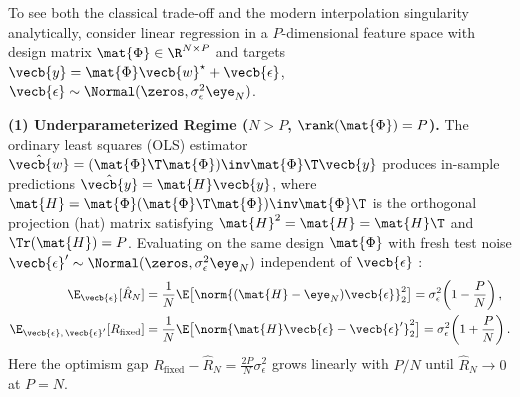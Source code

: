 \documentclass[../../../../master.tex]{subfiles}
\begin{document}
To see both the classical trade-off and the modern interpolation singularity analytically, consider linear regression in a $P$-dimensional feature space with design matrix $\mat{\Phi} \in \R^{N \times P}$ and targets $\vecb{y} = \mat{\Phi}\vecb{w}^\star + \vecb{\epsilon}$, $\vecb{\epsilon} \sim \Normal(\zeros, \sigma_\epsilon^2 \eye_N)$.

\begin{coremath}[Theorem: Exact Linear Risk Across the $P = N$ Threshold]
\label{thm:biasvar:linear_risk}
\textbf{(1) Underparameterized Regime ($N > P$, $\rank(\mat{\Phi}) = P$).}
The ordinary least squares (OLS) estimator $\hat{\vecb{w}} = (\mat{\Phi}\T\mat{\Phi})\inv\mat{\Phi}\T\vecb{y}$ produces in-sample predictions $\hat{\vecb{y}} = \mat{H}\vecb{y}$, where $\mat{H} = \mat{\Phi}(\mat{\Phi}\T\mat{\Phi})\inv\mat{\Phi}\T$ is the orthogonal projection (hat) matrix satisfying $\mat{H}^2 = \mat{H} = \mat{H}\T$ and $\Tr(\mat{H}) = P$. Evaluating on the same design $\mat{\Phi}$ with fresh test noise $\vecb{\epsilon}' \sim \Normal(\zeros, \sigma_\epsilon^2 \eye_N)$ independent of $\vecb{\epsilon}$ :
\begin{align}
  \E_{\vecb{\epsilon}}[\hat{R}_N] &= \frac{1}{N}\E\big[\norm{(\mat{H} - \eye_N)\vecb{\epsilon}}_2^2\big] = \sigma_\epsilon^2\!\left(1 - \frac{P}{N}\right), \nonumber \\
  \E_{\vecb{\epsilon},\,\vecb{\epsilon}'}[R_{\mathrm{fixed}}] &= \frac{1}{N}\E\big[\norm{\mat{H}\vecb{\epsilon} - \vecb{\epsilon}'}_2^2\big] = \sigma_\epsilon^2\!\left(1 + \frac{P}{N}\right).
  \label{eq:biasvar:chan_linear}
\end{align}
Here the optimism gap $R_{\mathrm{fixed}} - \hat{R}_N = \frac{2P}{N}\sigma_\epsilon^2$ grows linearly with $P/N$ until $\hat{R}_N \to 0$ at $P = N$.


\end{coremath}
\end{document}
